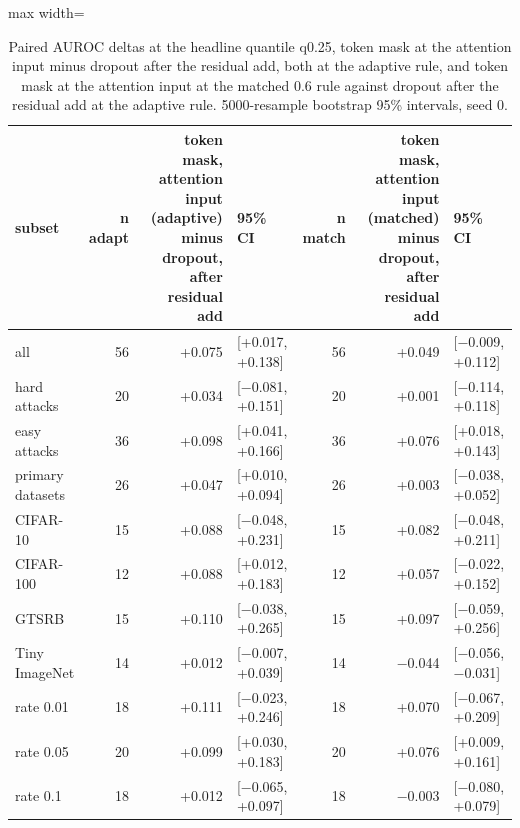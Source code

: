 \begin{table}[htbp]
\centering
\small
\caption{Paired AUROC deltas at the headline quantile q0.25, token mask at the attention input minus dropout after the residual add, both at the adaptive rule, and token mask at the attention input at the matched 0.6 rule against dropout after the residual add at the adaptive rule. 5000-resample bootstrap 95\% intervals, seed 0.}
\label{tab:headline-deltas}
\begin{adjustbox}{max width=\linewidth}
\begin{tabular}{lrrlrrl}
\toprule
subset & n adapt & token mask, attention input (adaptive) minus dropout, after residual add & 95\% CI & n match & token mask, attention input (matched) minus dropout, after residual add & 95\% CI \\
\midrule
all & 56 & +0.075 & [+0.017, +0.138] & 56 & +0.049 & [$-$0.009, +0.112] \\
hard attacks & 20 & +0.034 & [$-$0.081, +0.151] & 20 & +0.001 & [$-$0.114, +0.118] \\
easy attacks & 36 & +0.098 & [+0.041, +0.166] & 36 & +0.076 & [+0.018, +0.143] \\
primary datasets & 26 & +0.047 & [+0.010, +0.094] & 26 & +0.003 & [$-$0.038, +0.052] \\
CIFAR-10 & 15 & +0.088 & [$-$0.048, +0.231] & 15 & +0.082 & [$-$0.048, +0.211] \\
CIFAR-100 & 12 & +0.088 & [+0.012, +0.183] & 12 & +0.057 & [$-$0.022, +0.152] \\
GTSRB & 15 & +0.110 & [$-$0.038, +0.265] & 15 & +0.097 & [$-$0.059, +0.256] \\
Tiny ImageNet & 14 & +0.012 & [$-$0.007, +0.039] & 14 & $-$0.044 & [$-$0.056, $-$0.031] \\
rate 0.01 & 18 & +0.111 & [$-$0.023, +0.246] & 18 & +0.070 & [$-$0.067, +0.209] \\
rate 0.05 & 20 & +0.099 & [+0.030, +0.183] & 20 & +0.076 & [+0.009, +0.161] \\
rate 0.1 & 18 & +0.012 & [$-$0.065, +0.097] & 18 & $-$0.003 & [$-$0.080, +0.079] \\
\bottomrule
\end{tabular}
\end{adjustbox}
\end{table}
